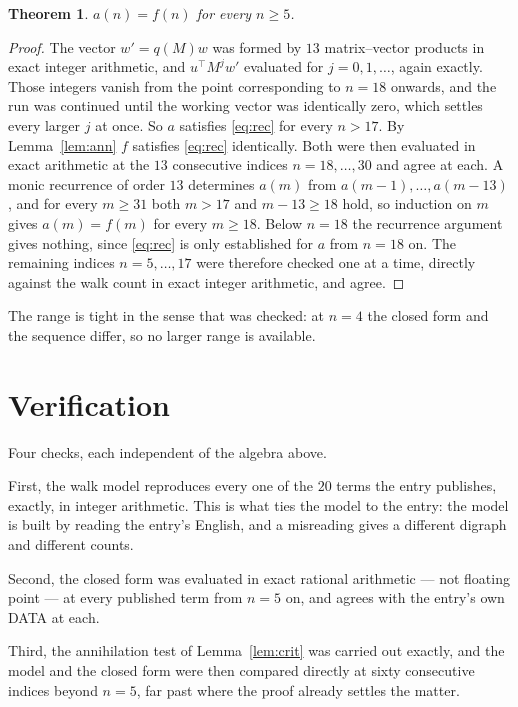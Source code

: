 \documentclass[11pt,a4paper]{article}
\theoremstyle{plain}
\newtheorem{theorem}{Theorem}
\theoremstyle{definition}
\begin{document}
\begin{theorem}
$a(n)=f(n)$ for every $n\ge5$.
\end{theorem}

\begin{proof}
The vector $w'=q(M)w$ was formed by $13$ matrix--vector products in exact integer
arithmetic, and $u^{\!\top}M^{j}w'$ evaluated for $j=0,1,\dots$, again exactly. Those integers
vanish from the point corresponding to $n=18$ onwards, and the run was continued until the
working vector was identically zero, which settles every larger $j$ at once. So $a$ satisfies
\eqref{eq:rec} for every $n>17$. By Lemma~\ref{lem:ann} $f$ satisfies \eqref{eq:rec}
identically. Both were then evaluated in exact arithmetic at the $13$ consecutive indices
$n=18,\dots,30$ and agree at each. A monic recurrence of order $13$
determines $a(m)$ from $a(m-1),\dots,a(m-13)$, and for every $m\ge31$ both
$m>17$ and $m-13\ge18$ hold, so induction on $m$ gives $a(m)=f(m)$ for every
$m\ge18$.
Below $n=18$ the recurrence argument gives nothing, since \eqref{eq:rec} is only
established for $a$ from $n=18$ on. The remaining indices $n=5,\dots,17$ were
therefore checked one at a time, directly against the walk count in exact integer arithmetic,
and agree.
\end{proof}

The range is tight in the sense that was checked: at $n=4$ the closed form and the sequence differ, so no larger range is available.

\section{Verification}

Four checks, each independent of the algebra above.

First, the walk model reproduces every one of the $20$ terms the entry publishes,
exactly, in integer arithmetic. This is what ties the model to the entry: the model is built
by reading the entry's English, and a misreading gives a different digraph and different
counts.

Second, the closed form was evaluated in exact rational arithmetic --- not floating point ---
at every published term from $n=5$ on, and agrees with the entry's own DATA at each.

Third, the annihilation test of Lemma~\ref{lem:crit} was carried out exactly, and the model
and the closed form were then compared directly at sixty consecutive indices beyond
$n=5$, far past where the proof already settles the matter.
\end{document}
